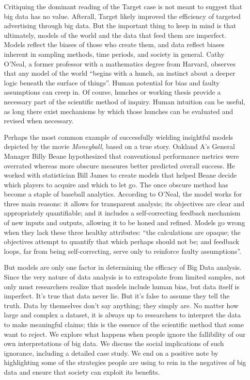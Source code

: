 \documentclass[sigconf]{acmart}
\begin{document}
Critiquing the dominant reading of the Target case is not meant to suggest that big data has no value. Afterall, Target likely improved the efficiency of targeted advertising through big data. But the important thing to keep in mind is that ultimately, models of the world and the data that feed them are imperfect. Models reflect the biases of those who create them, and data reflect biases inherent in sampling methods, time periods, and society in general. Cathy O'Neal, a former professor with a mathematics degree from Harvard, observes that any model of the world ``begins with a hunch, an instinct about a deeper logic beneath the surface of things''\cite{Wharton2016}. Human potential for bias and faulty assumptions can creep in. Of course, hunches or working thesis provide a necessary part of the scientific method of inquiry. Human intuition can be useful, as long there exist mechanisms by which those hunches can be evaluated and revised when necessary.

Perhaps the most common example of successfully wielding insightful models depicted by the movie {\em Moneyball}, based on a true story. Oakland A's General Manager Billy Beane hypothesized that conventional performance metrics were overrated whereas more obscure measures better predicted overall success. He worked with statistician Bill James to create models that helped Beane decide which players to acquire and which to let go. The once obscure method has become a staple of baseball analytics. According to O'Neal, the model works for three main reasons: it allows for transparent analysis; its objectives are clear and appropriately quantifiable; and it includes a self-correcting feedback mechanism of new inputs and outputs, allowing it to be honed and refined. Models go wrong when they lack these three healthy attributes: ``the calculations are opaque; the objectives attempt to quantify that which perhaps should not be; and feedback loops, far from being self-correcting, serve only to reinforce faulty assumptions''\cite{Wharton2016}.

But models are only one factor in determining the efficacy of Big Data analysis. Since the very nature of data analysis is to extrapolate from limited samples, not only must researchers realize that models include human bias, but data itself is imperfect. It's true that data never lie. But it's false to assume they tell the truth. Data by themselves don't say anything; they simply are\cite{Crawford2013}. No matter how large and complex a dataset, it is always up to researchers to interpret the data to make meaningful claims; this is the essence of the scientific method that some want to reject. We explore what happens when people ignore the fallibility of our own interpretations of big data. We discuss the social implications of such ignorance, including a detailed case study. We end on a positive note by highlighting some of the strategies people are using to rein in the negatives of big data and ensure that society can exploit its benefits.
\end{document}
